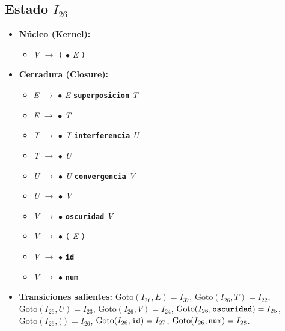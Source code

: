 \documentclass[12pt, letterpaper]{article}
\begin{document}
\subsection*{Estado $I_{26}$ }
\begin{itemize}\setlength{\itemsep}{1pt}\setlength{\parskip}{0pt}
\item \textbf{Núcleo (Kernel):}
\begin{itemize}\setlength{\itemsep}{1pt}\setlength{\parskip}{0pt}
    \item \textit{V} $\to$ \texttt{(} $\bullet$ \textit{E} \texttt{)}
\end{itemize}
\item \textbf{Cerradura (Closure):}
\begin{itemize}\setlength{\itemsep}{1pt}\setlength{\parskip}{0pt}
    \item \textit{E} $\to$ $\bullet$ \textit{E} \textbf{\texttt{superposicion}} \textit{T}
    \item \textit{E} $\to$ $\bullet$ \textit{T}
    \item \textit{T} $\to$ $\bullet$ \textit{T} \textbf{\texttt{interferencia}} \textit{U}
    \item \textit{T} $\to$ $\bullet$ \textit{U}
    \item \textit{U} $\to$ $\bullet$ \textit{U} \textbf{\texttt{convergencia}} \textit{V}
    \item \textit{U} $\to$ $\bullet$ \textit{V}
    \item \textit{V} $\to$ $\bullet$ \textbf{\texttt{oscuridad}} \textit{V}
    \item \textit{V} $\to$ $\bullet$ \texttt{(} \textit{E} \texttt{)}
    \item \textit{V} $\to$ $\bullet$ \textbf{\texttt{id}}
    \item \textit{V} $\to$ $\bullet$ \textbf{\texttt{num}}
\end{itemize}
\item \textbf{Transiciones salientes:} $\text{Goto}(I_{26}, \textit{E}) = I_{37}$, \quad $\text{Goto}(I_{26}, \textit{T}) = I_{22}$, \quad $\text{Goto}(I_{26}, \textit{U}) = I_{23}$, \quad $\text{Goto}(I_{26}, \textit{V}) = I_{24}$, \quad $\text{Goto}(I_{26}, \textbf{\texttt{oscuridad}}) = I_{25}$, \quad $\text{Goto}(I_{26}, \texttt{(}) = I_{26}$, \quad $\text{Goto}(I_{26}, \textbf{\texttt{id}}) = I_{27}$, \quad $\text{Goto}(I_{26}, \textbf{\texttt{num}}) = I_{28}$.
\end{itemize}
\vspace{2pt}
\end{document}
